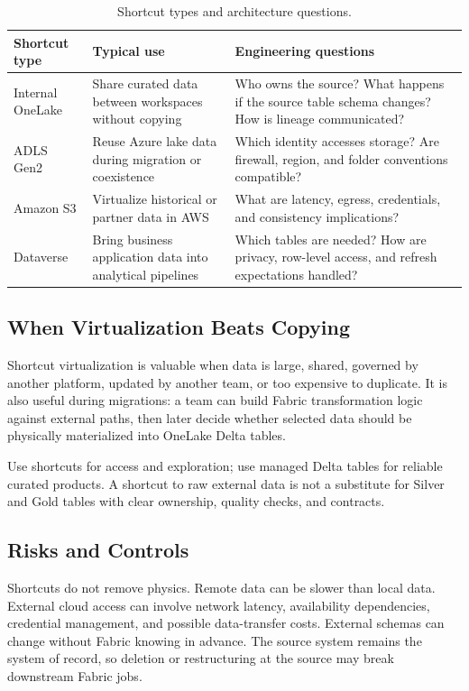 \begin{table}[H]
\centering
\small
\begin{tabular}{@{}p{3.2cm}p{4.8cm}p{5.4cm}@{}}
\toprule
\textbf{Shortcut type} & \textbf{Typical use} & \textbf{Engineering questions} \\
\midrule
Internal OneLake & Share curated data between workspaces without copying & Who owns the source? What happens if the source table schema changes? How is lineage communicated? \\
ADLS Gen2 & Reuse Azure lake data during migration or coexistence & Which identity accesses storage? Are firewall, region, and folder conventions compatible? \\
Amazon S3 & Virtualize historical or partner data in AWS & What are latency, egress, credentials, and consistency implications? \\
Dataverse & Bring business application data into analytical pipelines & Which tables are needed? How are privacy, row-level access, and refresh expectations handled? \\
\bottomrule
\end{tabular}
\caption{Shortcut types and architecture questions.}
\label{tab:chapter1-shortcut-types}
\end{table}

\subsection{When Virtualization Beats Copying}
Shortcut virtualization is valuable when data is large, shared, governed by another platform, updated by another team, or too expensive to duplicate. It is also useful during migrations: a team can build Fabric transformation logic against external paths, then later decide whether selected data should be physically materialized into OneLake Delta tables.

\begin{tipbox}
Use shortcuts for access and exploration; use managed Delta tables for reliable curated products. A shortcut to raw external data is not a substitute for Silver and Gold tables with clear ownership, quality checks, and contracts.
\end{tipbox}

\subsection{Risks and Controls}
Shortcuts do not remove physics. Remote data can be slower than local data. External cloud access can involve network latency, availability dependencies, credential management, and possible data-transfer costs. External schemas can change without Fabric knowing in advance. The source system remains the system of record, so deletion or restructuring at the source may break downstream Fabric jobs.

